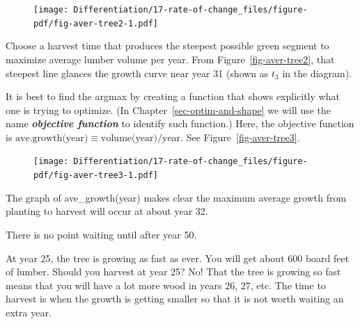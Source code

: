 \documentclass[
  letterpaper,
  DIV=11,
  numbers=noendperiod,
  oneside]{scrreprt}
\begin{document}
\begin{figure}


{\centering \texttt{[image: Differentiation/17-rate-of-change\_files/figure-pdf/fig-aver-tree2-1.pdf]}

}

\end{figure}

Choose a harvest time that produces the steepest possible green segment
to maximize average lumber volume per year. From
Figure~\ref{fig-aver-tree2}, that steepest line glances the growth curve
near year 31 (shown as \(t_3\) in the diagram).

It is best to find the argmax by creating a function that shows
explicitly what one is trying to optimize. (In
Chapter~\ref{sec-optim-and-shape} we will use the name
\textbf{\emph{objective function}} to identify such function.) Here, the
objective function is
\(\text{ave.growth(year)} \equiv \text{volume(year)} / \text{year}\).
See Figure~\ref{fig-aver-tree3}.

\begin{figure}


{\centering \texttt{[image: Differentiation/17-rate-of-change\_files/figure-pdf/fig-aver-tree3-1.pdf]}

}

\end{figure}

The graph of ave\_growth(year) makes clear the maximum average growth
from planting to harvest will occur at about year 32.

There is no point waiting until after year 50.

At year 25, the tree is growing as fast as ever. You will get about 600
board feet of lumber.
Should you harvest at year 25? No! That the tree is growing so fast
means that you will have a lot more wood in years 26, 27, etc. The time
to harvest is when the growth is getting smaller so that it is not worth
waiting an extra year.
\end{document}
